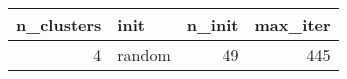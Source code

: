 \begin{tabular}{rlrr}
\toprule
n_clusters & init & n_init & max_iter \\
\midrule
4 & random & 49 & 445 \\
\bottomrule
\end{tabular}
